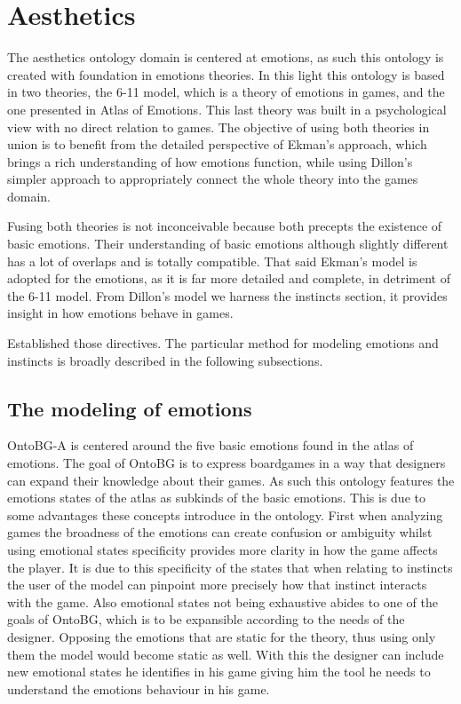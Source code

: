 \section{Aesthetics}

The aesthetics ontology domain is centered at emotions, as such this ontology is created with foundation in emotions theories. In this light this ontology is based in two theories, the \cite{dillon_way_2010} 6-11 model, which is a theory of emotions in games, and the one presented in \cite{ekmans_atlas} Atlas of Emotions. This last theory was built in a psychological view with no direct relation to games. The objective of using both theories in union is to benefit from the detailed perspective of Ekman's approach, which brings a rich understanding of how emotions function, while using Dillon's simpler approach to appropriately connect the whole theory into the games domain.

Fusing both theories is not inconceivable because both precepts the existence of basic emotions. Their understanding of basic emotions although slightly different has a lot of overlaps and is totally compatible. That said Ekman's model is adopted for the emotions, as it is far more detailed and complete, in detriment of the 6-11 model. From Dillon's model we harness the instincts section, it provides insight in how emotions behave in games. 

Established those directives. The particular method for modeling emotions and instincts is broadly described in the following subsections.

\subsection{The modeling of emotions}

OntoBG-A is centered around the five basic emotions found in the atlas of emotions. The goal of OntoBG is to express boardgames in a way that designers can expand their knowledge about their games. As such this ontology features the emotions states of the atlas as subkinds of the basic emotions. This is due to some advantages these concepts introduce in the ontology. First when analyzing games the broadness of the emotions can create confusion or ambiguity whilst using emotional states specificity provides more clarity in how the game affects the player. It is due to this specificity of the states that when relating to instincts the user of the model can pinpoint more precisely how that instinct interacts with the game. Also emotional states not being exhaustive abides to one of the goals of OntoBG, which is to be expansible according to the needs of the designer. Opposing the emotions that are static for the theory, thus using only them the model would become static as well. With this the designer can include new emotional states he identifies in his game giving him the tool he needs to understand the emotions behaviour in his game.

